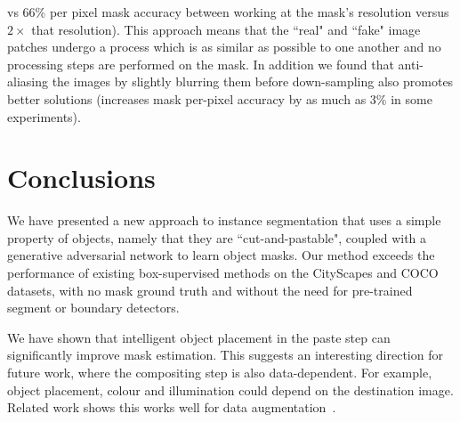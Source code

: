 \documentclass[runningheads]{llncs}
\begin{document}
vs 66\% per pixel mask accuracy between working at the mask's resolution versus $2\times$ that resolution). This approach means that the ``real" and ``fake" image patches undergo a process which is as similar as possible to one another and no processing steps are performed on the mask. In addition we found that anti-aliasing the images by slightly blurring them before down-sampling also promotes better solutions (increases mask per-pixel accuracy by as much as 3\% in some experiments). %

%

\section{Conclusions}
We have presented a new approach to instance segmentation that uses a simple property of objects, namely that they are ``cut-and-pastable", coupled with a generative adversarial network to learn object masks. Our method exceeds the performance of existing box-supervised methods on the CityScapes and COCO datasets, with no mask ground truth and without the need for pre-trained segment or boundary detectors.


We have shown that intelligent object placement in the paste step can significantly improve mask estimation. This suggests an interesting direction for future work, where the compositing step is also data-dependent. For example, object placement, colour and illumination could depend on the destination image. Related work shows this works well for data augmentation~\cite{dwibedi2017cut,georgakis2017synthesizing,alhaija2017augmented}. 
\end{document}

